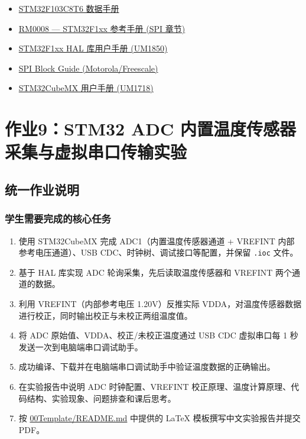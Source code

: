 \documentclass[
  chinese,
  UTF8,
  oneside,
  openany]{ctexbook}
\providecommand{\tightlist}{%
  \setlength{\itemsep}{0pt}\setlength{\parskip}{0pt}}
\begin{document}
\begin{itemize}
\tightlist
\item
  \href{https://www.st.com/resource/en/datasheet/stm32f103c8.pdf}{STM32F103C8T6
  数据手册}
\item
  \href{https://www.st.com/resource/en/reference_manual/rm0008-stm32f101xx-stm32f102xx-stm32f103xx-stm32f105xx-and-stm32f107xx-advanced-armbased-32bit-mcus-stmicroelectronics.pdf}{RM0008
  --- STM32F1xx 参考手册 (SPI 章节)}
\item
  \href{https://www.st.com/resource/en/user_manual/um1850-description-of-stm32f1-hal-and-lowlayer-drivers-stmicroelectronics.pdf}{STM32F1xx
  HAL 库用户手册 (UM1850)}
\item
  \href{https://www.nxp.com/files-static/training_pdf/SPI.pdf}{SPI Block
  Guide (Motorola/Freescale)}
\item
  \href{https://www.st.com/resource/en/user_manual/um1718-stm32cubemx-for-stm32-configuration-and-initialization-c-code-generation-stmicroelectronics.pdf}{STM32CubeMX
  用户手册 (UM1718)}
\end{itemize}

\chapter{作业9：STM32 ADC
内置温度传感器采集与虚拟串口传输实验}\label{ux4f5cux4e1a9stm32-adc-ux5185ux7f6eux6e29ux5ea6ux4f20ux611fux5668ux91c7ux96c6ux4e0eux865aux62dfux4e32ux53e3ux4f20ux8f93ux5b9eux9a8c}

\section{统一作业说明}\label{ux7edfux4e00ux4f5cux4e1aux8bf4ux660e-4}

\subsection{学生需要完成的核心任务}\label{ux5b66ux751fux9700ux8981ux5b8cux6210ux7684ux6838ux5fc3ux4efbux52a1-4}

\begin{enumerate}
\def\labelenumi{\arabic{enumi}.}
\tightlist
\item
  使用 STM32CubeMX 完成 ADC1（内置温度传感器通道 + VREFINT
  内部参考电压通道）、USB CDC、时钟树、调试接口等配置，并保留
  \texttt{.ioc} 文件。
\item
  基于 HAL 库实现 ADC 轮询采集，先后读取温度传感器和 VREFINT
  两个通道的数据。
\item
  利用 VREFINT（内部参考电压 1.20V）反推实际
  VDDA，对温度传感器数据进行校正，同时输出校正与未校正两组温度值。
\item
  将 ADC 原始值、VDDA、校正/未校正温度通过 USB CDC 虚拟串口每 1
  秒发送一次到电脑端串口调试助手。
\item
  成功编译、下载并在电脑端串口调试助手中验证温度数据的正确输出。
\item
  在实验报告中说明 ADC 时钟配置、VREFINT
  校正原理、温度计算原理、代码结构、实验现象、问题排查和课后思考。
\item
  按 \href{../00Template/README.md}{00Template/README.md} 中提供的 LaTeX
  模板撰写中文实验报告并提交 PDF。
\end{enumerate}
\end{document}

